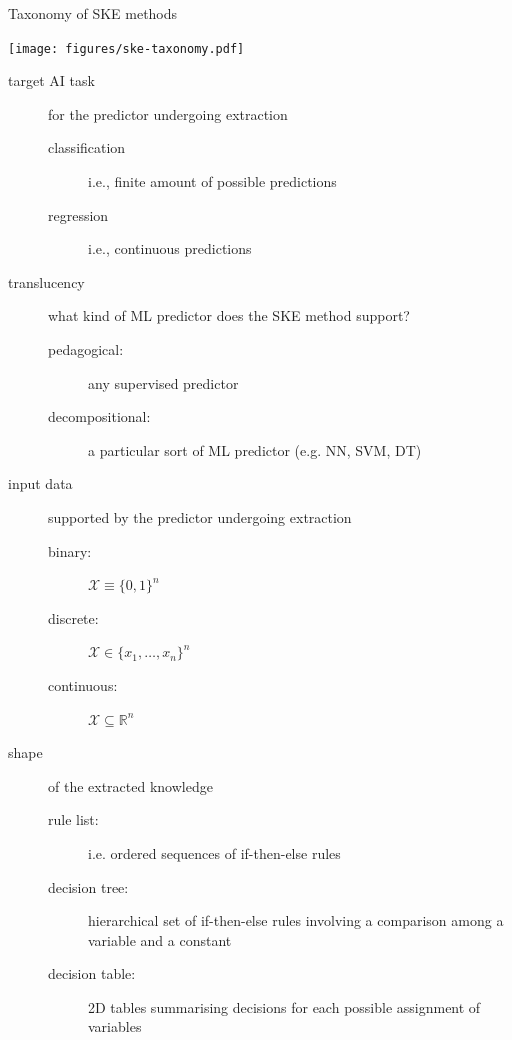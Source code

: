 \documentclass[presentation]{beamer}\mode<presentation>{\usetheme{AMSBolognaFC}}
\begin{document}
\begin{frame}[allowframebreaks]{Taxonomy of SKE methods}
    \begin{center}
        \texttt{[image: figures/ske-taxonomy.pdf]}
    \end{center}
    
    \framebreak

    \begin{description}
        \item[target AI task] for the predictor undergoing extraction
        \begin{description}
            \item[classification] i.e., finite amount of possible predictions
            \item[regression] i.e., continuous predictions
        \end{description} 

        \medskip

        \item[translucency] what kind of ML predictor does the SKE method support?
        \begin{description}
            \item[pedagogical:] any supervised predictor
            \item[decompositional:] a particular sort of ML predictor (e.g. NN, SVM, DT)      
        \end{description} 

        \medskip

        \item[input data] supported by the predictor undergoing extraction
        \begin{description}
            \item[binary:] $\mathcal{X} \equiv \{0, 1\}^n$
            \item[discrete:] $\mathcal{X} \in \{x_1, \ldots, x_n\}^n$   
            \item[continuous:] $\mathcal{X} \subseteq \mathbb{R}^n$     
        \end{description} 

        \framebreak

        \item[shape] of the extracted knowledge
        \begin{description}
            \item[rule list:] i.e. ordered sequences of if-then-else rules
            \item[decision tree:] hierarchical set of if-then-else rules involving a comparison among a variable and a constant   
            \item[decision table:] 2D tables summarising decisions for each possible assignment of variables
        \end{description} 


\end{description}
\end{frame}
\end{document}
